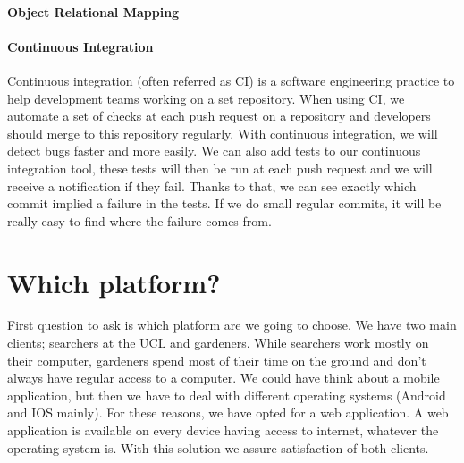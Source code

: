 \paragraph{Object Relational Mapping}

\paragraph{Continuous Integration}
Continuous integration (often referred as CI) is a software engineering practice to help development teams working on a set repository. 
When using CI, we automate a set of checks at each push request on a repository and developers should merge to this repository regularly. With continuous integration, we will detect bugs faster and more easily. We can also add tests to our continuous integration tool, these tests will then be run at each push request and we will receive a notification if they fail. Thanks to that, we can see exactly which commit implied a failure in the tests. If we do small regular commits, it will be really easy to find where the failure comes from.



\section{Which platform?}
First question to ask is which platform are we going to choose. We have two main clients; searchers at the UCL and gardeners. While searchers work mostly on their computer, gardeners spend most of their time on the ground and don't always have regular access to a computer. 
We could have think about a mobile application, but then we have to deal with different operating systems (Android and IOS mainly). For these reasons, we have opted for a web application. A web application is available on every device having access to internet, whatever the operating system is. With this solution we assure satisfaction of both clients.


